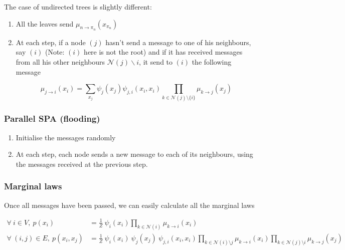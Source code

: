 \documentclass[12pt,a4paper]{report}
\begin{document}
The case of undirected trees is slightly different:

\begin{enumerate}
	\item All the leaves send \( \mu_{n \rightarrow \pi_n}(x_{\pi_n}) \)
	
	\item At each step, if a node \((j)\) hasn't send a message to one of his neighbours, say $(i)$ (Note: $(i)$ here is not the root) and if it has received messages from all his other neighbours \( \mathcal{N}(j) \backslash i\), it send to \( (i) \)  the following message
	
	\begin{equation}
		\mu_{j \rightarrow i}(x_i) = \sum_{x_j} \psi_j (x_j) \psi_{j,i} (x_i,x_i) \prod_{k \in \mathcal{N}(j) \setminus \{i\}} \mu_{k \rightarrow j}(x_j)
	\end{equation}
\end{enumerate}

\subsubsection{Parallel SPA (flooding)}

\begin{enumerate}
	\item Initialise the messages randomly
	\item At each step, each node sends a new message to each of its neighbours, using the messages received at the previous step.
	\end{enumerate}

\subsubsection{Marginal laws}

Once all messages have been passed, we can easily calculate all the marginal laws

\begin{align}
	\forall \ i \in V, \ p(x_i) &= \frac{1}{Z} \ \psi_{i} (x_i) \prod_{k \in \mathcal{N}(i)} \mu_{k \rightarrow i} (x_i) \\
	\forall \ (i,j) \in E, \ p(x_i,x_j) &= \frac{1}{Z} \ \psi_{i} (x_i) \  \psi_{j} (x_j) \ \psi_{j,i} (x_i,x_i) \!\!\prod_{k \in \mathcal{N}(i) \setminus j} \mu_{k \rightarrow i} (x_i) \!\!\prod_{k \in \mathcal{N}(j) \setminus i} \mu_{k \rightarrow j} (x_j)
\end{align}
\end{document}
